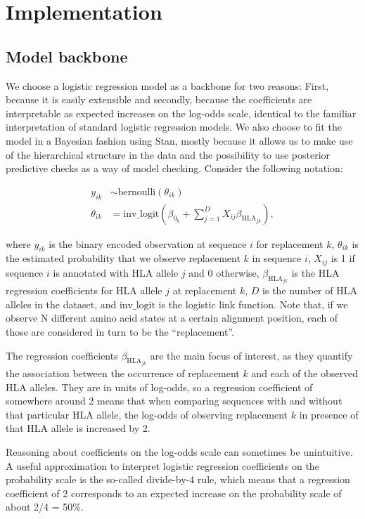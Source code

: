 \documentclass[fleqn,11pt]{SelfArx} %
\begin{document}
\section{Implementation}

\subsection*{Model backbone}

We choose a logistic regression model as a backbone for two reasons: First, because it is easily extensible and secondly, because the coefficients are interpretable as expected increases on the log-odds scale, identical to the familiar interpretation of standard logistic regression models.
We also choose to fit the model in a Bayesian fashion using Stan, mostly because it allows us to make use of the hierarchical structure in the data and the possibility to use posterior predictive checks as a way of model checking.
Consider the following notation:

\begin{align}
  y_{ik} & \sim \text{bernoulli}(\theta_{ik}) \\
  \theta_{ik} & = \text{inv\_logit}(\beta_{0_{k}} + \sum_{j=1}^{D} X_{ij}\beta_{\text{HLA}_{jk}}),
\end{align}

where \(y_{ik}\) is the binary encoded observation at sequence \(i\) for replacement \(k\), \(\theta_{ik}\) is the estimated probability that we observe replacement \(k\) in sequence \(i\), \(X_{ij}\) is 1 if sequence \(i\) is annotated with HLA allele \(j\) and 0 otherwise, \(\beta_{\text{HLA}_{jk}}\) is the HLA regression coefficients for HLA allele \(j\) at replacement \(k\), \(D\) is the number of HLA alleles in the dataset, and \(\text{inv\_logit}\) is the logistic link function. Note that, if we observe N different amino acid states at a certain alignment position, each of those are considered in turn to be the “replacement”.

The regression coefficients \(\beta_{\text{HLA}_{jk}}\) are the main focus of interest, as they quantify the association between the occurrence of replacement \(k\) and each of the observed HLA alleles. They are in units of log-odds, so a regression coefficient of somewhere around 2 means that when comparing sequences with and without that particular HLA allele, the log-odds of observing replacement \(k\) in presence of that HLA allele is increased by 2.

Reasoning about coefficients on the log-odds scale can sometimes be unintuitive. A useful approximation to interpret logistic regression coefficients on the probability scale is the so-called divide-by-4 rule, which means that a regression coefficient of 2 corresponds to an expected increase on the probability scale of about 2/4 = 50\%. 
\end{document}
